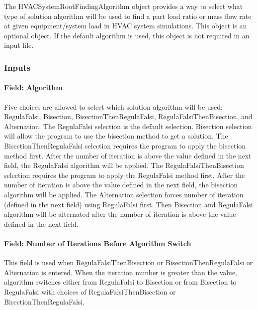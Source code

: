 The HVACSystemRootFindingAlgorithm object provides a way to select what type of solution
algorithm will be used to find a part load ratio or mass flow rate at given equipment/system load in HVAC system simulations. This object is an optional object. If the default algorithm is used, this object is not required in an input file.

\subsubsection{Inputs}\label{inputs-hvacystemrootfindingalgorithm}

\paragraph{Field: Algorithm}\label{field-algorithm-201710020807}

Five choices are allowed to select which solution algorithm will be used: RegulaFalsi, Bisection,  BisectionThenRegulaFalsi, RegulaFalsiThenBisection, and Alternation. The RegulaFalsi
selection is the default selection. Bisection selection will allow the program to use the bisection method to get a solution. The BisectionThenRegulaFalsi selection requires the program to apply the bisection method first. After the number of iteration is above the value defined in the next field, the RegulaFalsi algorithm will be applied. The RegulaFalsiThenBisection selection requires the program to apply the RegulaFalsi method first. After the number of iteration is above the value defined in the next field, the bisection algorithm will be applied. The Alternation selection forces number of iteration (defined in the next field) using RegulaFalsi first. Then Bisection and RegulaFalsi algorithm will be alternated after the number of iteration is above the value defined in the next field.

\paragraph{Field: Number of Iterations Before Algorithm Switch}\label{field-number-of-iteration-before-algorithm-switch}

This field is used when RegulaFalsiThenBisection or BisectionThenRegulaFalsi or Alternation is entered. When the iteration number is greater than the value, algorithm switches either from RegulaFalsi to Bisection or from Bisection to RegulaFalsi with choices of RegulaFalsiThenBisection or BisectionThenRegulaFalsi.

